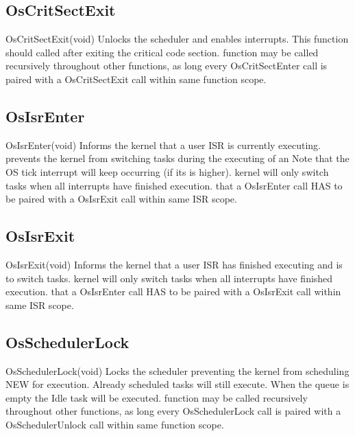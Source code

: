 \subsection{OsCritSectExit}
\label{func:OsCritSectExit}
\begin{pdfunction}
{OsCritSectExit(void) }
{ 
Unlocks the scheduler and enables interrupts. This function should 
called after exiting the critical code section. 
function may be called recursively throughout other functions, as long 
every OsCritSectEnter call is paired with a OsCritSectExit call within 
same function scope. }
\end{pdfunction}

\subsection{OsIsrEnter}
\label{func:OsIsrEnter}
\begin{pdfunction}
{OsIsrEnter(void) }
{ 
Informs the kernel that a user ISR is currently executing. 
prevents the kernel from switching tasks during the executing of an 
Note that the OS tick interrupt will keep occurring (if its 
is higher). 
kernel will only switch tasks when all interrupts have finished execution. 
that a OsIsrEnter call HAS to be paired with a OsIsrExit call within 
same ISR scope. }
\end{pdfunction}

\subsection{OsIsrExit}
\label{func:OsIsrExit}
\begin{pdfunction}
{OsIsrExit(void) }
{ 
Informs the kernel that a user ISR has finished executing and is 
to switch tasks. 
kernel will only switch tasks when all interrupts have finished execution. 
that a OsIsrEnter call HAS to be paired with a OsIsrExit call within 
same ISR scope. }
\end{pdfunction}

\subsection{OsSchedulerLock}
\label{func:OsSchedulerLock}
\begin{pdfunction}
{OsSchedulerLock(void) }
{ 
Locks the scheduler preventing the kernel from scheduling NEW 
for execution. Already scheduled tasks will still execute. When the 
queue is empty the Idle task will be executed. 
function may be called recursively throughout other functions, as long 
every OsSchedulerLock call is paired with a OsSchedulerUnlock call within 
same function scope. }
\end{pdfunction}

